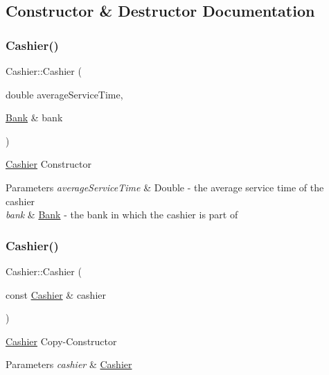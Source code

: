 \subsection{Constructor \& Destructor Documentation}
\mbox{\label{classCashier_a1616d49e92657698805bb9672df8c019}} 
\subsubsection{\texorpdfstring{Cashier()}{Cashier()}\hspace{0.1cm}{\footnotesize\ttfamily [1/2]}}
{\footnotesize\ttfamily Cashier\+::\+Cashier (\begin{DoxyParamCaption}\item[{double}]{average\+Service\+Time,  }\item[{\hyperlink{classBank}{Bank} \&}]{bank }\end{DoxyParamCaption})}

\hyperlink{classCashier}{Cashier} Constructor 
\begin{DoxyParams}{Parameters}
{\em average\+Service\+Time} & Double -\/ the average service time of the cashier \\
\hline
{\em bank} & \hyperlink{classBank}{Bank} -\/ the bank in which the cashier is part of \\
\hline
\end{DoxyParams}
\mbox{\label{classCashier_a1a4f6f058122e7c8d47eae5e64334ed6}} 
\subsubsection{\texorpdfstring{Cashier()}{Cashier()}\hspace{0.1cm}{\footnotesize\ttfamily [2/2]}}
{\footnotesize\ttfamily Cashier\+::\+Cashier (\begin{DoxyParamCaption}\item[{const \hyperlink{classCashier}{Cashier} \&}]{cashier }\end{DoxyParamCaption})}

\hyperlink{classCashier}{Cashier} Copy-\/\+Constructor 
\begin{DoxyParams}{Parameters}
{\em cashier} & \hyperlink{classCashier}{Cashier} \\
\hline
\end{DoxyParams}


